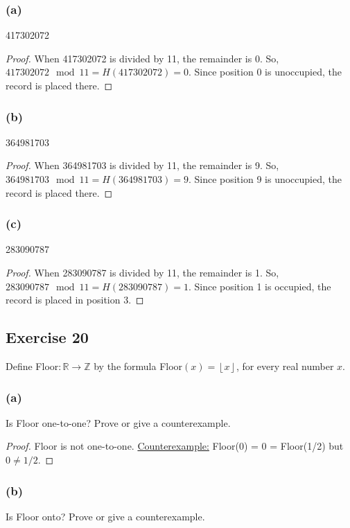 \documentclass[14pt]{extarticle}
\newcommand{\R}{\mathbb{R}}
\newcommand{\Z}{\mathbb{Z}}
\newcommand{\floor}[1]{{\left\lfloor#1\right\rfloor}}
\begin{document}
\subsubsection{(a)}
417302072

\begin{proof}
When 417302072 is divided by 11, the remainder is 0. So, \(417302072 \mod 11 = H(417302072) = 0\). 
Since position 0 is unoccupied, the record is placed there.
\end{proof}

\subsubsection{(b)}
364981703

\begin{proof}
When 364981703 is divided by 11, the remainder is 9. So, \(364981703 \mod 11 = H(364981703) = 9\). 
Since position 9 is unoccupied, the record is placed there.
\end{proof}

\subsubsection{(c)}
283090787

\begin{proof}
When 283090787 is divided by 11, the remainder is 1. So, \(283090787 \mod 11 = H(283090787) = 1\). Since position 1 
is occupied, the record is placed in position 3.
\end{proof}

\subsection{Exercise 20}
Define Floor\(: \R \to \Z\) by the formula Floor\((x) = \floor{x}\), for every real number $x$. 

\subsubsection{(a)}
Is Floor one-to-one? Prove or give a counterexample.

\begin{proof}
Floor is not one-to-one. \underline{Counterexample:} Floor(0) = 0 = Floor(1/2) but $0 \neq 1/2$.
\end{proof}

\subsubsection{(b)}
Is Floor onto? Prove or give a counterexample.
\end{document}
